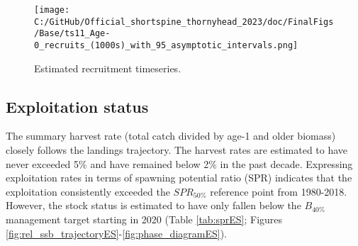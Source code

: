 \documentclass[11pt,
  letterpaper,
]{article}
\begin{document}
\begin{figure}
\centering
\texttt{[image: C:/GitHub/Official\_shortspine\_thornyhead\_2023/doc/FinalFigs/Base/ts11\_Age-0\_recruits\_(1000s)\_with\_95\_asymptotic\_intervals.png]}
\caption{Estimated recruitment timeseries.\label{fig:rec_trajectoryES}}
\end{figure}

\hypertarget{exploitation-status}{%
\subsection*{Exploitation status}\label{exploitation-status}}

The summary harvest rate (total catch divided by age-1 and older biomass) closely follows the landings trajectory. The harvest rates are estimated to have never exceeded 5\% and have remained below 2\% in the past decade. Expressing exploitation rates in terms of spawning potential ratio (SPR) indicates that the exploitation consistently exceeded the \(SPR_{50\%}\) reference point from 1980-2018. However, the stock status is estimated to have only fallen below the \(B_{40\%}\) management target starting in 2020 (Table \ref{tab:sprES}; Figures \ref{fig:rel_ssb_trajectoryES}-\ref{fig:phase_diagramES}).

\begingroup\fontsize{10}{12}\selectfont
\begingroup\fontsize{10}{12}\selectfont
\end{document}

